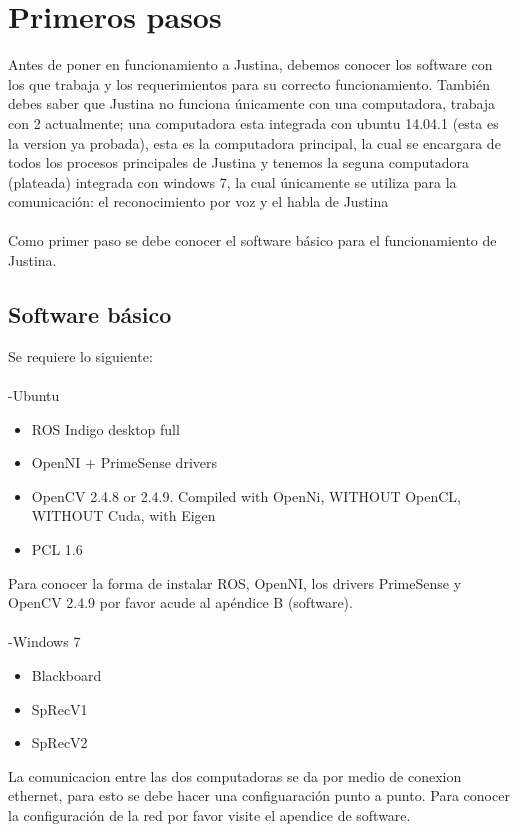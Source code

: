 \documentclass[user_manual.tex]{subfiles}
\begin{document}
 \chapter{Primeros pasos}
 Antes de poner en funcionamiento a Justina, debemos conocer los software con los que trabaja y los requerimientos para  su correcto funcionamiento. También debes saber que Justina no funciona únicamente con una computadora, trabaja con 2 actualmente; una computadora esta integrada con ubuntu 14.04.1 (esta es la version ya probada), esta es la computadora principal, la cual se encargara de todos los procesos principales de Justina y tenemos la seguna computadora (plateada) integrada con windows 7, la cual únicamente se utiliza para la comunicación: el reconocimiento por voz y el habla de Justina\\
 \\
 Como primer paso se debe conocer el software básico para el funcionamiento de Justina.
 
 \section{Software básico}

Se requiere lo siguiente:\\
\\
-Ubuntu
\begin{itemize}
\item ROS Indigo desktop full
\item OpenNI + PrimeSense drivers
\item OpenCV 2.4.8 or 2.4.9. Compiled with OpenNi, WITHOUT OpenCL, WITHOUT Cuda, with Eigen
\item PCL 1.6
\end{itemize}

Para conocer la forma de instalar ROS, OpenNI, los drivers PrimeSense y OpenCV 2.4.9 por favor acude al apéndice B (software).\\
\\
-Windows 7
\begin{itemize}
\item Blackboard
\item SpRecV1
\item SpRecV2
\end{itemize}

La comunicacion entre las dos computadoras se da por medio de conexion ethernet, para esto se debe hacer una configuaración punto a punto. Para conocer la configuración de la red por favor visite el apendice de software.
\end{document}
